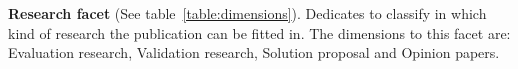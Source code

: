 \textbf{Research facet} (See table~\ref{table:dimensions}).
Dedicates to classify in which kind of research the publication can be fitted in. 
The dimensions to this facet are: Evaluation research, Validation research, Solution proposal 
and Opinion papers.


